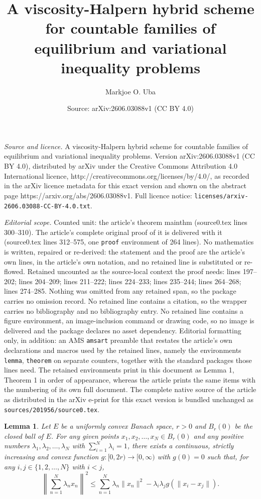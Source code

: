 \documentclass[10pt,a4paper]{amsart}
\title{A viscosity-Halpern hybrid scheme for countable families of equilibrium and variational inequality problems}
\author{Markjoe O. Uba}
\date{Source: arXiv:2606.03088v1 (CC BY 4.0)}
\newtheorem{lemma}{Lemma}
\begin{document}
\maketitle

\noindent\emph{Source and licence.} A viscosity-Halpern hybrid scheme for countable families of equilibrium and variational inequality problems. Version arXiv:2606.03088v1 (CC BY 4.0), distributed by arXiv under the Creative Commons Attribution 4.0 International licence, http://creativecommons.org/licenses/by/4.0/, as recorded in the arXiv licence metadata for this exact version and shown on the abstract page https://arxiv.org/abs/2606.03088v1. Full licence notice: \texttt{licenses/arxiv-2606.03088-CC-BY-4.0.txt}.\par\smallskip

\noindent\textit{Editorial scope.} Counted unit: the article's theorem mainthm (source0.tex lines 300--310). The article's complete original proof of it is delivered with it (source0.tex lines 312--575, one \texttt{proof} environment of 264 lines). No mathematics is written, repaired or re-derived: the statement and the proof are the article's own lines, in the article's own notation, and no retained line is substituted or re-flowed.  Retained uncounted as the source-local context the proof needs: lines 197--202; lines 204--209; lines 211--222; lines 224--233; lines 235--244; lines 264--268; lines 274--285.  Nothing was omitted from any retained span, so the package carries no omission record.  No retained line contains a citation, so the wrapper carries no bibliography and no bibliography entry.  No retained line contains a figure environment, an image-inclusion command or drawing code, so no image is delivered and the package declares no asset dependency.  Editorial formatting only, in addition: an AMS \texttt{amsart} preamble that restates the article's own declarations and macros used by the retained lines, namely the environments \texttt{lemma}, \texttt{theorem} on separate counters, together with the standard packages those lines need.  The retained environments print in this document as Lemma 1, Theorem 1 in order of appearance, whereas the article prints the same items with the numbering of its own full document.  The complete native source of the article as distributed in the arXiv e-print for this exact version is bundled unchanged as \texttt{sources/201956/source0.tex}.
\begin{lemma}\label{glemma}
Let $E$ be a uniformly convex Banach space, $r>0$ and $B_r(0)$ be the closed ball of $E$. For any given points $x_1,x_2,\ldots,x_N\in B_r(0)$ and any positive numbers $\lambda_1,\lambda_2,\ldots,\lambda_N$ with $\sum_{i=1}^{N}\lambda_i=1$, there exists a continuous, strictly increasing and convex function $g:[0,2r)\to [0,\infty)$ with $g(0)=0$ such that, for any $i,j\in\{1,2,\ldots,N\}$ with $i<j$,
\[
\left\|\sum_{n=1}^{N}\lambda_nx_n\right\|^2\leq \sum_{n=1}^{N}\lambda_n\|x_n\|^2-\lambda_i\lambda_jg(\|x_i-x_j\|).
\]
\end{lemma}
\end{document}
